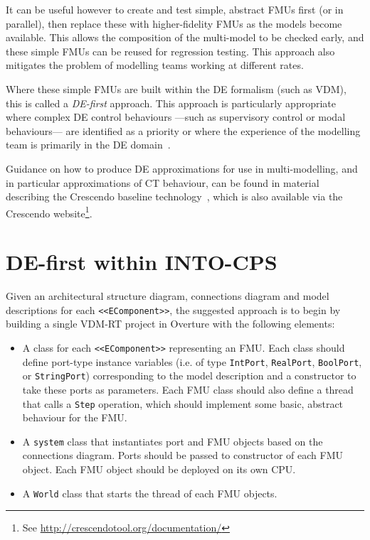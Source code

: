 It can be useful however to create and test simple, abstract FMUs first (or in parallel), then replace these with higher-fidelity FMUs as the models become available. This allows the composition of the multi-model to be checked early, and these simple FMUs can be reused for regression testing. This approach also mitigates the problem of modelling teams working at different rates.

Where these simple FMUs are built within the DE formalism (such as VDM), this is called a \emph{DE-first} approach. This approach is particularly appropriate where complex DE control behaviours ---such as supervisory control or modal behaviours--- are identified as a priority or where the experience of the modelling team is primarily in the DE domain~\cite{Fitzgerald&14c}.

Guidance on how to produce DE approximations for use in multi-modelling, and in particular approximations of CT behaviour, can be found in material describing the Crescendo baseline technology~\cite{Fitzgerald&13a}, which is also available via the Crescendo website\footnote{See \url{http://crescendotool.org/documentation/}}.

\section{DE-first within INTO-CPS}

Given an architectural structure diagram, connections diagram and model descriptions for each \texttt{<<EComponent>>}, the suggested approach is to begin by building a single VDM-RT project in Overture with the following elements:

\begin{itemize}[noitemsep]
\item A class for each \texttt{<<EComponent>>} representing an FMU. Each class should define port-type instance variables (i.e. of type \texttt{IntPort}, \texttt{RealPort}, \texttt{BoolPort}, or \texttt{StringPort}) corresponding to the model description and a constructor to take these ports as parameters. Each FMU class should also define a thread that calls a \texttt{Step} operation, which should implement some basic, abstract behaviour for the FMU.
\item A \texttt{system} class that instantiates port and FMU objects based on the connections diagram. Ports should be passed to constructor of each FMU object. Each FMU object should be deployed on its own CPU.
\item A \texttt{World} class that starts the thread of each FMU objects.
\end{itemize}

